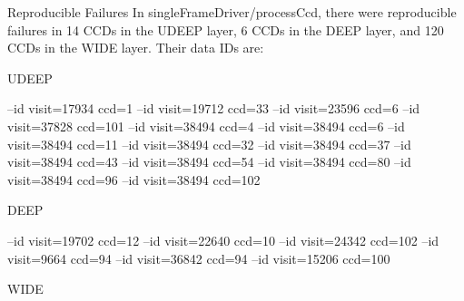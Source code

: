 Reproducible Failures
In singleFrameDriver/processCcd, there were reproducible failures in 14 CCDs in the UDEEP layer, 6 CCDs in the DEEP layer, and 120 CCDs in the WIDE layer.  Their data IDs are: 

UDEEP

--id visit=17934 ccd=1 --id visit=19712 ccd=33 --id visit=23596 ccd=6 --id visit=37828 ccd=101 --id visit=38494 ccd=4 --id visit=38494 ccd=6 --id visit=38494 ccd=11 --id visit=38494 ccd=32 --id visit=38494 ccd=37 --id visit=38494 ccd=43 --id visit=38494 ccd=54 --id visit=38494 ccd=80 --id visit=38494 ccd=96 --id visit=38494 ccd=102

DEEP

--id visit=19702 ccd=12 --id visit=22640 ccd=10 --id visit=24342 ccd=102 --id visit=9664 ccd=94 --id visit=36842 ccd=94 --id visit=15206 ccd=100

WIDE

